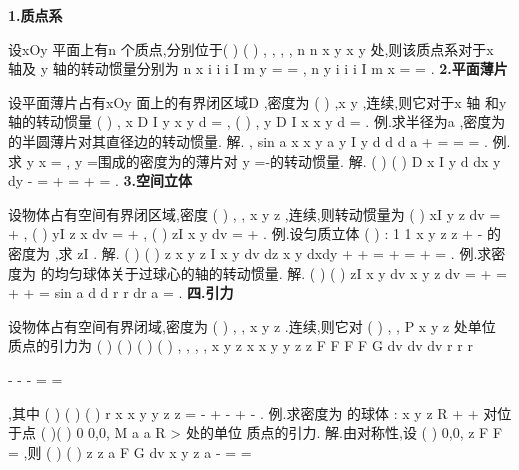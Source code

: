 {\bfseries \textcolor{lyred}{1.质点系}}

设xOy 平面上有n 个质点,分别位于(
)
(
)
,
,
,
,
n
n
x y
x
y
\Lambda 
处,则该质点系对于x 轴及 
y 轴的\textcolor{lyred}{转动惯量}分别为
n
x
i
i
i
I
m y
=
=\sum 
,
n
y
i
i
i
I
m x
=
=\sum 
. 
{\bfseries \textcolor{lyred}{2.平面薄片}}

设平面薄片占有xOy 面上的有界闭区域D ,密度为
(
)
,x y
\mu 
,连续,则它对于x 轴
和y 轴的\textcolor{lyred}{转动惯量}
(
)
,
x
D
I
y
x y d
\mu 
\sigma 
=\int \int 
,
(
)
,
y
D
I
x
x y d
\mu 
\sigma 
=\int \int 
. 
\textcolor{lyred}{例}.求半径为a ,密度为\mu 的半圆薄片对其直径边的转动惯量. 
解.
,
sin
a
x
x
y
a
y
I
y d
d
d
a
\pi 
\mu 
\sigma 
\mu 
\theta \rho 
\theta \rho \rho 
\pi \mu 
+
\le 
\ge 
=
=
\cdots 
=
\int \int 
\int 
\int 
. 
\textcolor{lyred}{例}.求
y
x
=
,
y =围成的密度为\mu 的薄片对
y =-的转动惯量. 
解.
(
)
(
)
D
x
I
y
d
dx
y
dy
\mu \sigma 
\mu 
\mu 
-
=
+
=
+
=
\int \int 
\int 
\int 
. 
{\bfseries \textcolor{lyred}{3.空间立体}}

设物体占有空间有界闭区域\Omega ,密度
(
)
, ,
x y z
\rho 
,连续,则转动惯量为 
(
)
xI
y
z
dv
\rho 
\Omega 
=
+
\cdots 
\int \int \int 
,
(
)
yI
z
x
dv
\rho 
\Omega 
=
+
\cdots 
\int \int \int 
,
(
)
zI
x
y
dv
\rho 
\Omega 
=
+
\cdots 
\int \int \int 
. 
\textcolor{lyred}{例}.设匀质立体
(
)
:
1 1
x
y
z
z
\Omega 
+
-
\le 
\le 
\le 
的密度为
\rho ,求
zI . 
解.
(
)
(
)
z
x
y
z
I
x
y
dv
dz
x
y
dxdy
\rho 
\rho 
\pi \rho 
\Omega 
+
\le 
+
=
+
=
+
=
\int \int \int 
\int 
\int \int 
. 
\textcolor{lyred}{例}.求密度为
\rho 的均匀球体关于过球心的轴的转动惯量. 
解.
(
)
(
)
zI
x
y
dv
x
y
z
dv
\rho 
\rho 
\Omega 
\Omega 
=
+
=
+
+
=
\int \int \int 
\int \int \int 
sin
a
d
d
r
r dr
a
\pi 
\pi 
\rho 
\theta 
\varphi \varphi 
\pi \rho 
\cdots 
=
\int 
\int 
\int 
. 
\vspace{4pt}
{\bfseries \textcolor{lyred}{四.引力}}

设物体占有空间有界闭域\Omega ,密度为
(
)
, ,
x y z
\rho 
.连续,则它对
(
)
,
,
P x
y z
处单位 
质点的\textcolor{lyred}{引力}为 
(
)
(
)
(
)
(
)
,
,
,
,
x
y
z
x
x
y
y
z
z
F
F F F
G
dv
dv
dv
r
r
r
\rho 
\rho 
\rho 
\Omega 
\Omega 
\Omega 


-
-
-
=
=




\int \int \int 
\int \int \int 
\int \int \int 
\rho 
,其中 
(
)
(
)
(
)
r
x
x
y
y
z
z
=
-
+
-
+
-
. 
\textcolor{lyred}{例}.求密度为
\rho 的球体
: x
y
z
R
\Omega 
+
+
\le 
对位于点
(
)(
)
0 0,0,
M
a
a
R
>
处的单位 
质点的引力. 
解.由对称性,设
(
)
0,0,
z
F
F
=
\rho 
,则
(
)
(
)
z
z
a
F
G
dv
x
y
z
a
\rho 
\Omega 
-
=
=


